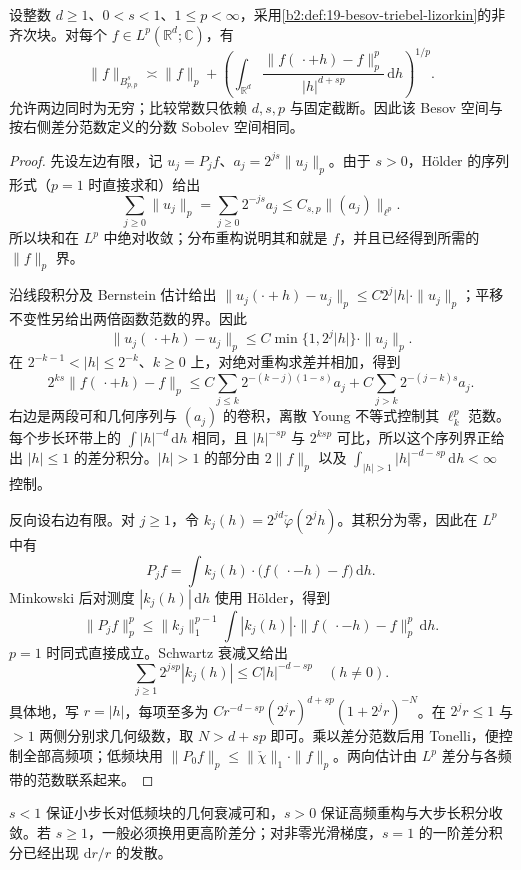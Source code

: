 \begin{proposition}\label{b2:prop:19-besov-difference}
设整数 \(d\geq1\)、\(0<s<1\)、\(1\leq p<\infty\)，采用\cref{b2:def:19-besov-triebel-lizorkin}的非齐次块。对每个 \(f\in L^p(\mathbb R^d;\mathbb C)\)，有
\[
 \|f\|_{B^s_{p,p}}\asymp
 \|f\|_p+
 \left(\int_{\mathbb R^d}
 \frac{\|f(\,\cdot+h)-f\|_p^p}{|h|^{d+sp}}\,\mathrm dh\right)^{1/p}.
\]
允许两边同时为无穷；比较常数只依赖 \(d,s,p\) 与固定截断。因此该 Besov 空间与按右侧差分范数定义的分数 Sobolev 空间相同。
\end{proposition}
\begin{proof}
先设左边有限，记 \(u_j=P_jf\)、\(a_j=2^{js}\|u_j\|_p\)。由于 \(s>0\)，Hölder 的序列形式（\(p=1\) 时直接求和）给出
\[
 \sum_{j\geq0}\|u_j\|_p
 =\sum_{j\geq0}2^{-js}a_j
 \leq C_{s,p}\|(a_j)\|_{\ell^p}.
\]
所以块和在 \(L^p\) 中绝对收敛；分布重构说明其和就是 \(f\)，并且已经得到所需的 \(\|f\|_p\) 界。

沿线段积分及 Bernstein 估计给出 \(\|u_j(\cdot+h)-u_j\|_p\leq C2^j|h|\cdot\|u_j\|_p\)；平移不变性另给出两倍函数范数的界。因此
\[
 \|u_j(\,\cdot+h)-u_j\|_p
 \leq C\min\{1,2^j|h|\}\cdot\|u_j\|_p.
\]
在 \(2^{-k-1}<|h|\leq2^{-k}\)、\(k\geq0\) 上，对绝对重构求差并相加，得到
\[
 2^{ks}\|f(\,\cdot+h)-f\|_p
 \leq C\sum_{j\leq k}2^{-(k-j)(1-s)}a_j
       +C\sum_{j>k}2^{-(j-k)s}a_j.
\]
右边是两段可和几何序列与 \((a_j)\) 的卷积，离散 Young 不等式控制其 \(\ell^p_k\) 范数。每个步长环带上的 \(\int|h|^{-d}\,\mathrm dh\) 相同，且 \(|h|^{-sp}\) 与 \(2^{ksp}\) 可比，所以这个序列界正给出 \(|h|\leq1\) 的差分积分。\(|h|>1\) 的部分由 \(2\|f\|_p\) 以及 \(\int_{|h|>1}|h|^{-d-sp}\,\mathrm dh<\infty\) 控制。

反向设右边有限。对 \(j\geq1\)，令 \(k_j(h)=2^{jd}\check\varphi(2^jh)\)。其积分为零，因此在 \(L^p\) 中有
\[
 P_jf=\int k_j(h)\cdot\bigl(f(\,\cdot-h)-f\bigr)\,\mathrm dh.
\]
Minkowski 后对测度 \(|k_j(h)|\,\mathrm dh\) 使用 Hölder，得到
\[
 \|P_jf\|_p^p
 \leq\|k_j\|_1^{p-1}
       \int|k_j(h)|\cdot\|f(\,\cdot-h)-f\|_p^p\,\mathrm dh.
\]
\(p=1\) 时同式直接成立。Schwartz 衰减又给出
\[
 \sum_{j\geq1}2^{jsp}|k_j(h)|\leq C|h|^{-d-sp}\quad(h\ne0).
\]
具体地，写 \(r=|h|\)，每项至多为 \(Cr^{-d-sp}(2^jr)^{d+sp}(1+2^jr)^{-N}\)。在 \(2^jr\leq1\) 与 \(>1\) 两侧分别求几何级数，取 \(N>d+sp\) 即可。乘以差分范数后用 Tonelli，便控制全部高频项；低频块用 \(\|P_0f\|_p\leq\|\check\chi\|_1\cdot\|f\|_p\)。两向估计由 \(L^p\) 差分与各频带的范数联系起来。
\end{proof}
\(s<1\) 保证小步长对低频块的几何衰减可和，\(s>0\) 保证高频重构与大步长积分收敛。若 \(s\geq1\)，一般必须换用更高阶差分；对非零光滑梯度，\(s=1\) 的一阶差分积分已经出现 \(\mathrm dr/r\) 的发散。

